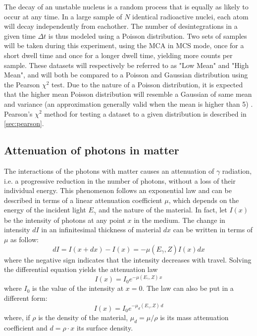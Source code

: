 The decay of an unstable nucleus is a random process that is equally as likely to occur at any time. 
In a large sample of \(N\) identical radioactive nuclei, each atom will decay independently from eachother. 
The number of desintegrations in a given time \(\Delta t\) is thus modeled 
using a Poisson distribution. Two sets of samples will be taken during this 
experiment, using the MCA in MCS mode, once for a short dwell time and once for a 
longer dwell time, yielding more counts per sample. These datasets will 
respectively be referred to as "Low Mean" and "High Mean", and will 
both be compared to a Poisson and Gaussian distribution using the Pearson 
\(\chi^2\) test. Due to the nature of a Poisson distribution, it is expected that 
the higher mean Poisson distribution will resemble a Gaussian of same mean and 
variance (an approximation generally valid when the mean is higher than 5) \cite{statistics_nuclear_particle_physicists}. Pearson's \(\chi^2\) method for testing a dataset to a given 
distribution is described in \autoref{sec:pearson}. 

\subsection{Attenuation of photons in matter}
\label{sec:attenuation}

The interactions of the photons with matter causes an attenuation of $\gamma$ radiation, i.e. a progressive reduction in the number of photons, without a loss of their individual energy.
This phenomenon follows an exponential law and can be described in terms of a linear attenuation coefficient $\mu$, which depends on the energy of the incident light $E_{\gamma}$ and the nature of the material.
In fact, let $I(x)$ be the intensity of photons at any point $x$ in the medium.
The change in intensity $dI$ in an infinitesimal thickness of material $dx$ can be written in terms of $\mu$ as follow:
\begin{equation}
    dI = I(x + dx) - I(x) = -\mu(E_{\gamma}, Z) I(x) dx
\end{equation}
where the negative sign indicates that the intensity decreases with travel.
Solving the differential equation yields the attenuation law
\begin{equation} \label{eq:attenuation_law}
    I(x) = I_0 e^{-\mu(E_{\gamma}, Z) \, x}
\end{equation}
where $I_0$ is the value of the intensity at $x=0$. 
The law can also be put in a different form:
\begin{equation} \label{eq:attenuation_law_density}
    I(x) = I_0 e^{-\mu_d(E_{\gamma}, Z) \, d}
\end{equation}
where, if $\rho$ is the density of the material, $\mu_d = \mu / \rho$ is its mass attenuation coefficient and $d = \rho \cdot x$ its surface density.

